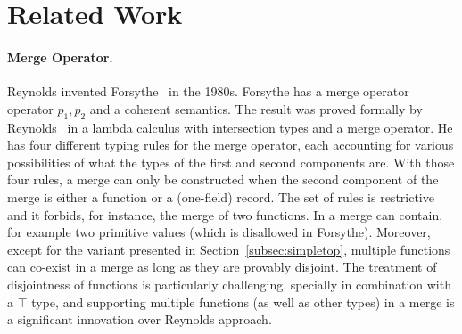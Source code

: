 \section{Related Work}
\label{sec:related-work}

\paragraph{Merge Operator.}
Reynolds invented Forsythe~\cite{reynolds1997design} in the
1980s. Forsythe has a merge operator operator $p_1, p_2 $ and a
coherent semantics. The result was proved formally by
Reynolds~\cite{reynolds1991coherence} in a lambda calculus with
intersection types and a merge operator. He has four different typing
rules for the merge operator, each accounting for various
possibilities of what the types of the first and second components
are. With those four rules, a merge can only be constructed when the
second component of the merge is either a function or a (one-field)
record. The set of rules is restrictive and it forbids, for instance,
the merge of two functions. In \name a merge can contain, 
for example two primitive values (which is disallowed in Forsythe). 
Moreover, except for the variant presented in Section~\ref{subsec:simpletop}, multiple 
functions can co-exist in a merge as long as they are provably disjoint.
The treatment of disjointness of functions is particularly
challenging, specially in combination with a $\top$ type, and
supporting multiple functions (as well as other types) in a merge is 
a significant innovation over Reynolds approach. 

